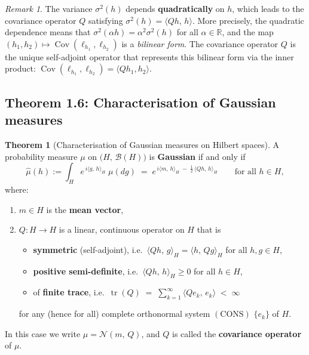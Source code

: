 \documentclass[11pt]{article}
\theoremstyle{definition}
\newtheorem{theorem}{Theorem}
\theoremstyle{remark}
\newtheorem{remark}{Remark}
\DeclareMathOperator{\tr}{tr}
\begin{document}
\begin{remark}
The variance $\sigma^2(h)$ depends \textbf{quadratically} on $h$,
which leads to the covariance operator $Q$ satisfying
$\sigma^2(h) = \langle Qh,\, h \rangle$.
More precisely, the quadratic dependence means that $\sigma^2(\alpha h) = \alpha^2 \sigma^2(h)$ for all $\alpha \in \mathbb{R}$, and the map $(h_1, h_2) \mapsto \operatorname{Cov}(\ell_{h_1}, \ell_{h_2})$ is a \emph{bilinear form}.  The covariance operator $Q$ is the unique self-adjoint operator that represents this bilinear form via the inner product: $\operatorname{Cov}(\ell_{h_1}, \ell_{h_2}) = \langle Qh_1, h_2 \rangle$.
\end{remark}

\subsection*{Theorem 1.6: Characterisation of Gaussian measures}

\begin{theorem}[Characterisation of Gaussian measures on Hilbert spaces]
A probability measure $\mu$ on $\bigl(H,\,\mathcal{B}(H)\bigr)$ is
\textbf{Gaussian} if and only if
\[
    \hat{\mu}(h) := \int_H e^{\,i\langle g,\, h \rangle_H}\;\mu(dg)
    \;=\;
    e^{\,i\langle m,\, h \rangle_H
      \;-\;\tfrac{1}{2}\,\langle Qh,\, h \rangle_H}
    \qquad \text{for all } h \in H,
\]
where:
\begin{enumerate}
    \item[\textup{a)}] $m \in H$ is the \textbf{mean vector},
    \item[\textup{b)}] $Q \colon H \to H$ is a linear, continuous operator on $H$ that is
    \begin{itemize}
        \item \textbf{symmetric} (self-adjoint), i.e.\
              $\langle Qh,\, g \rangle_H = \langle h,\, Qg \rangle_H$
              for all $h, g \in H$,
        \item \textbf{positive semi-definite}, i.e.\
              $\langle Qh,\, h \rangle_H \ge 0$ for all $h \in H$,
        \item of \textbf{finite trace}, i.e.\
              $\displaystyle
              \tr(Q)
              \;=\;
              \sum_{k=1}^{\infty}
              \langle Q e_k,\, e_k \rangle
              \;<\;\infty$
    \end{itemize}
    for any (hence for all) complete orthonormal system
    $\mathrm{(CONS)}$ $\{e_k\}$ of $H$.
\end{enumerate}
In this case we write $\mu = \mathcal{N}(m,\, Q)$, and $Q$ is called
the \textbf{covariance operator} of $\mu$.
\end{theorem}
\end{document}

